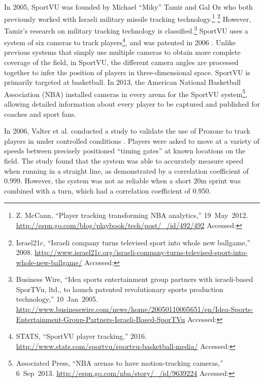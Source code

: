 In 2005, SportVU was founded by Michael ``Miky'' Tamir and Gal Oz who
both previously worked with Israeli military missile tracking
technology.\footnote{Z. McCann, ``Player tracking transforming NBA
  analytics,'' 19~May~2012.
  \url{http://espn.go.com/blog/playbook/tech/post/_/id/492/492}
  Accessed: } \footnote{Israel21c, ``Israeli company turns
  televised sport into whole new ballgame,'' 2008.
  \url{http://www.israel21c.org/israeli-company-turns-televised-sport-into-whole-new-ballgame/}
  Accessed: } However, Tamir's research on military tracking
technology is classified.\footnote{Business Wire, ``Idea sports
  entertainment group partners with israeli-based SporTVu, ltd., to
  launch patented revolutionary sports production technology,''
  10~Jan~2005.
  \url{http://www.businesswire.com/news/home/20050110005651/en/Idea-Sports-Entertainment-Group-Partners-Israeli-Based-SporTVu}
  Accessed: } SportVU uses a system of six cameras to track
players\footnote{STATS, ``SportVU player tracking,'' 2016.
\url{http://www.stats.com/sportvu/sportvu-basketball-media/} Accessed:
}, and was patented in 2006 \cite{oz_real-time_2009}.
Unlike previous systems that simply use multiple cameras to obtain more
complete coverage of the field, in SportVU, the different camera angles
are processed together to infer the position of players in three-dimensional space.
SportVU is primarily targeted at basketball. In 2013, the American
National Basketball Association (NBA) installed cameras in every arena
for the SportVU system\footnote{Associated Press, ``NBA arenas to have
  motion-tracking cameras,'' 6~Sep~2013.
  \url{http://espn.go.com/nba/story/_/id/9639224} Accessed: },
allowing detailed information about every player to be captured and
published for coaches and sport fans.


In 2006, Valter et al. conducted a study to validate the use of Prozone
to track players in \soccer{} under controlled conditions
\cite{Valter2006}. Players were asked to move at a variety
of speeds between precisely positioned ``timing gates'' at known
locations on the field. The study found that the system was able to
accurately measure speed when running in a straight line, as
demonstrated by a correlation coefficient of 0.999. However, the system
was not as reliable when a short 20\thinspace m sprint was combined with
a turn, which had a correlation coefficient of 0.950.

